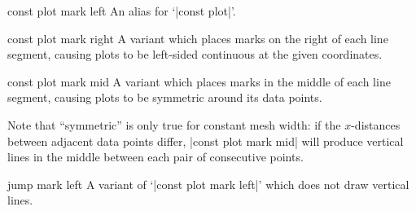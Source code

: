 {\begin{plottype}{const plot mark left}
    An alias for `|const plot|'.
\end{plottype}

\begin{plottype}{const plot mark right}
    A variant which places marks on the right of each line segment, causing
    plots to be left-sided continuous at the given coordinates.
\begin{codeexample}[]
\end{codeexample}
\end{plottype}

\begin{plottype}{const plot mark mid}
    A variant which places marks in the middle of each line segment, causing
    plots to be symmetric around its data points.
\begin{codeexample}[]
\end{codeexample}
    Note that ``symmetric'' is only true for constant mesh width: if the
    $x$-distances between adjacent data points differ, |const plot mark mid|
    will produce vertical lines in the middle between each pair of consecutive
    points.
\end{plottype}

\begin{plottype}{jump mark left}
    A variant of `|const plot mark left|' which does not draw vertical lines.
\begin{codeexample}[]
\end{codeexample}
\end{plottype}}
